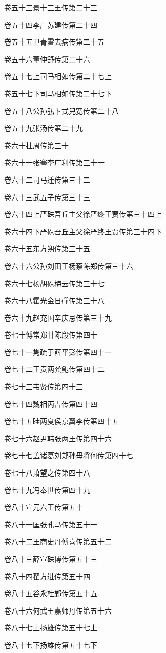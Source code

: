 \documentclass[12pt,UTF8]{ctexbook}
\begin{document}
卷五十三景十三王传第二十三

卷五十四李广苏建传第二十四

卷五十五卫青霍去病传第二十五

卷五十六董仲舒传第二十六

卷五十七上司马相如传第二十七上

卷五十七下司马相如传第二十七下

卷五十八公孙弘卜式兒宽传第二十八

卷五十九张汤传第二十九

卷六十杜周传第三十

卷六十一张骞李广利传第三十一

卷六十二司马迁传第三十二

卷六十三武五子传第三十三

卷六十四上严硃吾丘主父徐严终王贾传第三十四上

卷六十四下严硃吾丘主父徐严终王贾传第三十四下

卷六十五东方朔传第三十五

卷六十六公孙刘田王杨蔡陈郑传第三十六

卷六十七杨胡硃梅云传第三十七

卷六十八霍光金日磾传第三十八

卷六十九赵充国辛庆忌传第三十九

卷七十傅常郑甘陈段传第四十

卷七十一隽疏于薛平彭传第四十一

卷七十二王贡两龚鲍传第四十二

卷七十三韦贤传第四十三

卷七十四魏相丙吉传第四十四

卷七十五眭两夏侯京翼李传第四十五

卷七十六赵尹韩张两王传第四十六

卷七十七盖诸葛刘郑孙毋将何传第四十七

卷七十八萧望之传第四十八

卷七十九冯奉世传第四十九

卷八十宣元六王传第五十

卷八十一匡张孔马传第五十一

卷八十二王商史丹傅喜传第五十二

卷八十三薛宣硃博传第五十三

卷八十四翟方进传第五十四

卷八十五谷永杜鄴传第五十五

卷八十六何武王嘉师丹传第五十六

卷八十七上扬雄传第五十七上

卷八十七下扬雄传第五十七下
\end{document}
